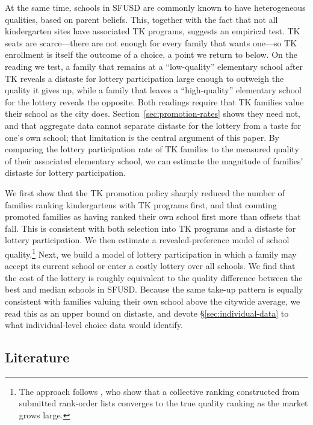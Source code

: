 \documentclass{article}
\begin{document}
At the same time, schools in SFUSD are commonly known to have heterogeneous qualities, based on parent beliefs. This, together with the fact that not all kindergarten sites have associated TK programs, suggests an empirical test. TK seats are scarce---there are not enough for every family that wants one---so TK enrollment is itself the outcome of a choice, a point we return to below. On the reading we test, a family that remains at a ``low-quality'' elementary school after TK reveals a distaste for lottery participation large enough to outweigh the quality it gives up, while a family that leaves a ``high-quality'' elementary school for the lottery reveals the opposite. Both readings require that TK families value their school as the city does. Section~\ref{sec:promotion-rates} shows they need not, and that aggregate data cannot separate distaste for the lottery from a taste for one's own school; that limitation is the central argument of this paper. By comparing the lottery participation rate of TK families to the measured quality of their associated elementary school, we can estimate the magnitude of families' distaste for lottery participation.

We first show that the TK promotion policy sharply reduced the number of families ranking kindergartens with TK programs first, and that counting promoted families as having ranked their own school first more than offsets that fall. This is consistent with both selection into TK programs and a distaste for lottery participation. We then estimate a revealed-preference model of school quality.\footnote{The approach follows \cite{aryal2025}, who show that a collective ranking constructed from submitted rank-order lists converges to the true quality ranking as the market grows large.} Next, we build a model of lottery participation in which a family may accept its current school or enter a costly lottery over all schools. We find that the cost of the lottery is roughly equivalent to the quality difference between the best and median schools in SFUSD. Because the same take-up pattern is equally consistent with families valuing their own school above the citywide average, we read this as an upper bound on distaste, and devote \S\ref{sec:individual-data} to what individual-level choice data would identify.



\subsection{Literature}
\end{document}
